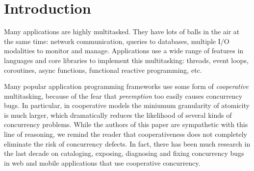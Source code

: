 \documentclass[acmsmall,anonymous,review]{acmart}\settopmatter{printfolios=true,printccs=false,printacmref=false}
\begin{document}

\maketitle




\section{Introduction}

Many applications are highly multitasked.
They have lots of balls in the air at the same time: network communication, queries to databases, multiple I/O modalities to monitor and manage.
Applications use a wide range of features in languages and core libraries to implement this multitasking: threads, event loops, coroutines, async functions, functional reactive programming, etc.\footnotemark{}


Many popular application programming frameworks use some form of \emph{cooperative} multitasking, because of the fear that \emph{preemption} too easily causes concurrency bugs.
In particular, in cooperative models the miniumum granularity of atomicity is much larger, which dramatically reduces the likelihood of several kinds of concurrency problems.
While the authors of this paper are sympathetic with this line of reasoning, we remind the reader that cooperativeness does not completely eliminate the risk of concurrency defects\footnotemark{}.
In fact, there has been much research in the last decade on cataloging, exposing, diagnosing and fixing concurrency bugs in web and mobile applications that use cooperative concurrency.
\end{document}
